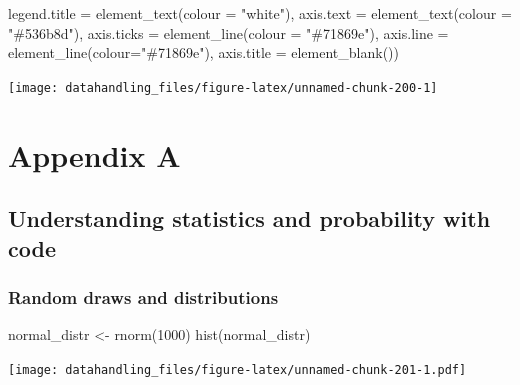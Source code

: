 \documentclass[
  12pt,
]{style/krantz}
\newenvironment{Shaded}{\begin{snugshade}}{\end{snugshade}}
\newcommand{\AttributeTok}[1]{\textcolor[rgb]{0.77,0.63,0.00}{#1}}
\newcommand{\DecValTok}[1]{\textcolor[rgb]{0.00,0.00,0.81}{#1}}
\newcommand{\FunctionTok}[1]{\textcolor[rgb]{0.00,0.00,0.00}{#1}}
\newcommand{\NormalTok}[1]{#1}
\newcommand{\OtherTok}[1]{\textcolor[rgb]{0.56,0.35,0.01}{#1}}
\newcommand{\StringTok}[1]{\textcolor[rgb]{0.31,0.60,0.02}{#1}}
\begin{document}
\begin{Shaded}
\begin{Highlighting}[]
        \AttributeTok{legend.title =} \FunctionTok{element\_text}\NormalTok{(}\AttributeTok{colour =} \StringTok{"white"}\NormalTok{),}
        \AttributeTok{axis.text =} \FunctionTok{element\_text}\NormalTok{(}\AttributeTok{colour =} \StringTok{"\#536b8d"}\NormalTok{),}
        \AttributeTok{axis.ticks =} \FunctionTok{element\_line}\NormalTok{(}\AttributeTok{colour =} \StringTok{"\#71869e"}\NormalTok{),}
        \AttributeTok{axis.line =} \FunctionTok{element\_line}\NormalTok{(}\AttributeTok{colour=}\StringTok{"\#71869e"}\NormalTok{),}
        \AttributeTok{axis.title =} \FunctionTok{element\_blank}\NormalTok{())}
\end{Highlighting}
\end{Shaded}

\texttt{[image: datahandling\_files/figure-latex/unnamed-chunk-200-1]}

\backmatter

\hypertarget{appendix-appendix}{%
\appendix {}}


\hypertarget{appendix-a}{%
\chapter{Appendix A}\label{appendix-a}}

\hypertarget{understanding-statistics-and-probability-with-code}{%
\section{Understanding statistics and probability with code}\label{understanding-statistics-and-probability-with-code}}

\hypertarget{random-draws-and-distributions}{%
\subsection{Random draws and distributions}\label{random-draws-and-distributions}}

\begin{Shaded}
\begin{Highlighting}[]
\NormalTok{normal\_distr }\OtherTok{\textless{}{-}} \FunctionTok{rnorm}\NormalTok{(}\DecValTok{1000}\NormalTok{)}
\FunctionTok{hist}\NormalTok{(normal\_distr)}
\end{Highlighting}
\end{Shaded}

\texttt{[image: datahandling\_files/figure-latex/unnamed-chunk-201-1.pdf]}
\end{document}
